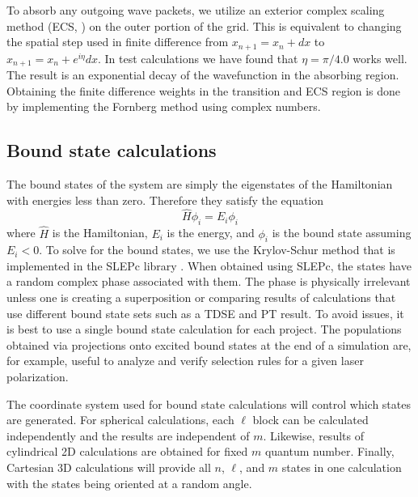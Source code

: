 To absorb any outgoing wave packets, we utilize an exterior complex scaling method (ECS, \cite{He2007}) on the outer portion of the grid. This is equivalent to changing the spatial step used in finite difference from $x_{n+1} = x_n+dx$ to $x_{n+1} = x_n+e^{i\eta}dx$. In test calculations we have found that $\eta=\pi / 4.0$ works well. The result is an exponential decay of the wavefunction in the absorbing region. Obtaining the finite difference weights in the transition and ECS region is done by implementing the Fornberg method \cite{Fornberg1988} using complex numbers.


\subsection{Bound state calculations} %
\label{sub:bound_state_calculations}
The bound states of the system are simply the eigenstates of the Hamiltonian with energies less than zero. Therefore they satisfy the equation 
\begin{equation}
    \hat{H} \phi_i = E_i \phi_i
\end{equation}
where $\hat{H}$ is the Hamiltonian, $E_i$ is the energy, and $\phi_i$ is the bound state assuming $E_i < 0$. To solve for the bound states, we use the Krylov-Schur method that is implemented in the SLEPc library \cite{slepc-toms,slepc-manual}. When obtained using SLEPc, the states have a random complex phase associated with them. The phase is physically irrelevant unless one is creating a superposition or comparing results of calculations that use different bound state sets such as a TDSE and PT result. To avoid issues, it is best to use a single bound state calculation for each project. The populations obtained via projections onto excited bound states at the end of a simulation are, for example, useful to analyze and verify selection rules for a given laser polarization.

The coordinate system used for bound state calculations will control which states are generated. For spherical calculations, each $\ell$ block can be calculated independently and the results are independent of $m$. Likewise, results of cylindrical 2D calculations are obtained for fixed $m$ quantum number. Finally, Cartesian 3D calculations will provide all $n$, $\ell$, and $m$ states in one calculation with the states being oriented at a random angle.

